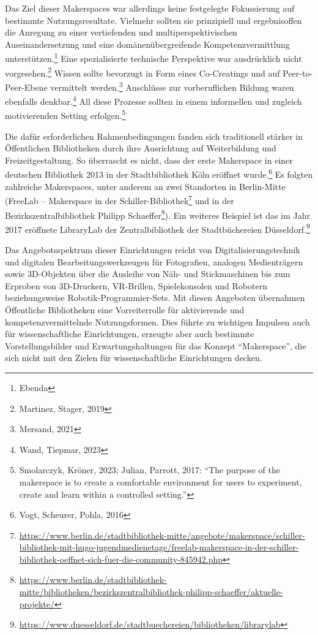 \documentclass[a4paper,
fontsize=11pt,
oneside,
numbers=noperiodatend,
parskip=half-,
bibliography=totoc,
final
]{scrartcl}
\begin{document}
Das Ziel dieser Makerspaces war allerdings keine festgelegte
Fokussierung auf bestimmte Nutzungsresultate. Vielmehr sollten sie
prinzipiell und ergebnisoffen die Anregung zu einer vertiefenden und
multiperspektivischen Auseinandersetzung und eine domänenübergreifende
Kompetenzvermittlung unterstützen.\footnote{Ebenda} Eine spezialisierte
technische Perspektive war ausdrücklich nicht vorgesehen.\footnote{Martinez,
  Stager, 2019} Wissen sollte bevorzugt in Form eines Co-Creatings und
auf Peer-to-Peer-Ebene vermittelt werden.\footnote{Mersand, 2021}
Anschlüsse zur vorberuflichen Bildung waren ebenfalls
denkbar.\footnote{Wand, Tiepmar, 2023} All diese Prozesse sollten in
einem informellen und zugleich motivierenden Setting
erfolgen.\footnote{Smolarczyk, Kröner, 2023; Julian, Parrott, 2017:
  \enquote{The purpose of the makerspace is to create a comfortable
  environment for users to experiment, create and learn within a
  controlled setting.}}

Die dafür erforderlichen Rahmenbedingungen fanden sich traditionell
stärker in Öffentlichen Bibliotheken durch ihre Ausrichtung auf
Weiterbildung und Freizeitgestaltung. So überrascht es nicht, dass der
erste Makerspace in einer deutschen Bibliothek 2013 in der
Stadtbibliothek Köln eröffnet wurde.\footnote{Vogt, Scheurer, Pohla,
  2016} Es folgten zahlreiche Makerspaces, unter anderem an zwei
Standorten in Berlin-Mitte (FreeLab -- Makerspace in der
Schiller-Bibliothek\footnote{\url{https://www.berlin.de/stadtbibliothek-mitte/angebote/makerspace/schiller-bibliothek-mit-hugo-jugendmedienetage/freelab-makerspace-in-der-schiller-bibliothek-oeffnet-sich-fuer-die-community-845942.php}}
und in der Bezirkszentralbibliothek Philipp Schaeffer\footnote{\url{https://www.berlin.de/stadtbibliothek-mitte/bibliotheken/bezirkszentralbibliothek-philipp-schaeffer/aktuelle-projekte/}}).
Ein weiteres Beispiel ist das im Jahr 2017 eröffnete LibraryLab der
Zentralbibliothek der Stadtbüchereien Düsseldorf.\footnote{\url{https://www.duesseldorf.de/stadtbuechereien/bibliotheken/librarylab}}

Das Angebotsspektrum dieser Einrichtungen reicht von
Digitalisierungstechnik und digitalen Bearbeitungswerkzeugen für
Fotografien, analogen Medienträgern sowie 3D-Objekten über die Ausleihe
von Näh- und Stickmaschinen bis zum Erproben von 3D-Druckern,
VR-Brillen, Spielekonsolen und Robotern beziehungsweise
Robotik-Programmier-Sets. Mit diesen Angeboten übernahmen Öffentliche
Bibliotheken eine Vorreiterrolle für aktivierende und
kompetenzvermittelnde Nutzungsformen. Dies führte zu wichtigen Impulsen
auch für wissenschaftliche Einrichtungen, erzeugte aber auch bestimmte
Vorstellungsbilder und Erwartungshaltungen für das Konzept
\enquote{Makerspace}, die sich nicht mit den Zielen für
wissenschaftliche Einrichtungen decken.
\end{document}

